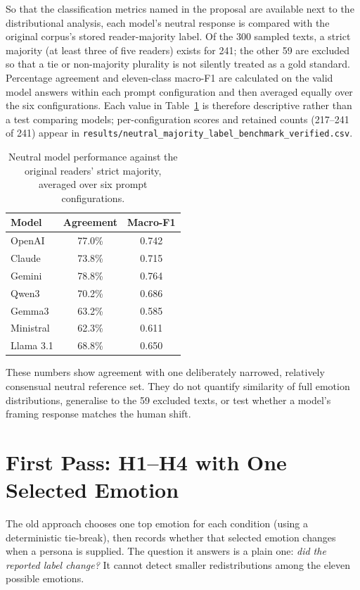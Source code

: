 \noindent
So that the classification metrics named in the proposal are available next to the distributional
analysis, each model's neutral response is compared with the original corpus's stored
reader-majority label. Of the 300 sampled texts, a strict majority (at least three of five
readers) exists for 241; the other 59 are excluded so that a tie or non-majority plurality is not
silently treated as a gold standard. Percentage agreement and eleven-class macro-F1 are
calculated on the valid model answers within each prompt configuration and then averaged equally
over the six configurations. Each value in Table~\ref{tab:majoritybenchmark} is therefore
descriptive rather than a test comparing models; per-configuration scores and retained counts
(217--241 of 241) appear in
\texttt{results/\allowbreak neutral\_\allowbreak majority\_\allowbreak label\_\allowbreak benchmark\_\allowbreak verified.csv}.

\begin{table}[h]
\centering
\footnotesize
\caption{Neutral model performance against the original readers' strict majority, averaged over six prompt configurations.}
\label{tab:majoritybenchmark}
\begin{tabular}{lcc}
\hline
\textbf{Model} & \textbf{Agreement} & \textbf{Macro-F1} \\
\hline
OpenAI & 77.0\% & 0.742 \\
Claude & 73.8\% & 0.715 \\
Gemini & 78.8\% & 0.764 \\
Qwen3 & 70.2\% & 0.686 \\
Gemma3 & 63.2\% & 0.585 \\
Ministral & 62.3\% & 0.611 \\
Llama 3.1 & 68.8\% & 0.650 \\
\hline
\end{tabular}
\end{table}

\noindent
These numbers show agreement with one deliberately narrowed, relatively consensual neutral
reference set. They do not quantify similarity of full emotion distributions, generalise to the
59 excluded texts, or test whether a model's framing response matches the human shift.

\section{First Pass: H1--H4 with One Selected Emotion}
\label{res:oldfirst}

\noindent
The old approach chooses one top emotion for each condition (using a deterministic tie-break),
then records whether that selected emotion changes when a persona is supplied. The question it
answers is a plain one: \emph{did the reported label change?} It cannot detect smaller
redistributions among the eleven possible emotions.

